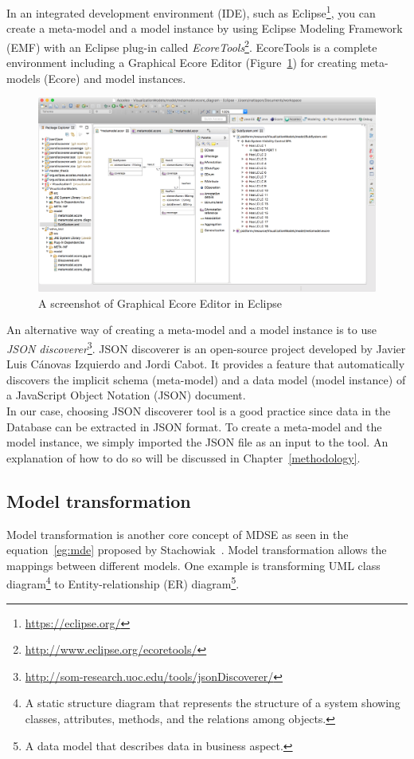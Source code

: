 In an integrated development environment (IDE), such as Eclipse\footnote{\url{https://eclipse.org/}}, you can create a meta-model and a model instance by using Eclipse Modeling Framework (EMF) with an Eclipse plug-in called \textit{EcoreTools}\footnote{\url{http://www.eclipse.org/ecoretools/}}. EcoreTools is a complete environment including a Graphical Ecore Editor (Figure~\ref{fig:screenshot_ecore_editor}) for creating meta-models (Ecore) and model instances. 

\begin{figure}[H]
\centering
\captionsetup{justification=centering}
\vspace{0cm}%
\includegraphics[width=0.95\linewidth]{figure/misc/screenshot_ecore_editor.png}
\caption{A screenshot of Graphical Ecore Editor in Eclipse}
\label{fig:screenshot_ecore_editor}
\end{figure}

An alternative way of creating a meta-model and a model instance is to use \textit{JSON discoverer}\footnote{\url{http://som-research.uoc.edu/tools/jsonDiscoverer/}}. JSON discoverer is an open-source project developed by Javier Luis Cánovas Izquierdo and Jordi Cabot. It provides a feature that automatically discovers the implicit schema (meta-model) and a data model (model instance) of a JavaScript Object Notation (JSON) document.\\ 

In our case, choosing JSON discoverer tool is a good practice since data in the Database can be extracted in JSON format. To create a meta-model and the model instance, we simply imported the JSON file as an input to the tool. An explanation of how to do so will be discussed in Chapter~\ref{methodology}.


\subsection{Model transformation}
\label{model_transformation}
Model transformation is another core concept of MDSE as seen in the equation~\ref{eg:mde} proposed by Stachowiak~\cite{Stachowiak}. Model transformation allows the mappings between different models. One example is transforming UML class diagram\footnote{A static structure diagram that represents the structure of a system showing classes, attributes, methods, and the relations among objects.} to Entity-relationship (ER) diagram\footnote{A data model that describes data in business aspect.}. \\


